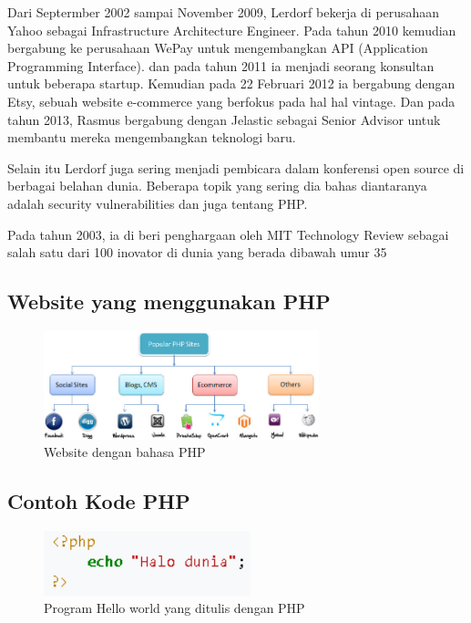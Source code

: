 Dari Septermber 2002 sampai November 2009, Lerdorf bekerja di perusahaan Yahoo sebagai Infrastructure Architecture Engineer. Pada tahun 2010 kemudian bergabung ke perusahaan WePay untuk mengembangkan API (Application Programming Interface). dan pada tahun 2011 ia menjadi seorang konsultan untuk beberapa startup. Kemudian pada 22 Februari 2012 ia bergabung dengan Etsy, sebuah website e-commerce yang berfokus pada hal hal vintage. Dan pada tahun 2013, Rasmus bergabung dengan Jelastic sebagai Senior Advisor untuk membantu mereka mengembangkan teknologi baru.

Selain itu Lerdorf juga sering menjadi pembicara dalam konferensi open source di berbagai belahan dunia. Beberapa topik yang sering dia bahas diantaranya adalah security vulnerabilities dan juga tentang PHP.

Pada tahun 2003, ia di beri penghargaan oleh MIT Technology Review sebagai salah satu dari 100 inovator di dunia yang berada dibawah umur 35
\subsection{Website yang menggunakan PHP} 
	\begin{figure}[H]
		\includegraphics[width=8cm]{figures/web/popularphpsites.jpg}
		\centering
		\caption{Website dengan bahasa PHP}
	\end{figure}

\subsection{Contoh Kode PHP}
	\begin{figure}[H]
		\includegraphics[width=6cm]{figures/web/contohkodingphp.png}
		\centering
		\caption{Program Hello world yang ditulis dengan PHP}
	\end{figure}

